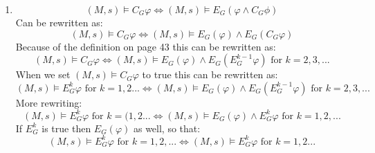\documentclass[12pt]{article} %
\begin{document}
\begin{enumerate}
    \item 
        \begin{equation}
        (M,s) \models C_G\varphi \Leftrightarrow (M,s) \models E_G(\varphi \wedge
        C_G\phi) 
        \end{equation}
        Can be rewritten as:
        \begin{equation}
            (M,s) \models C_G\varphi \Leftrightarrow (M,s) \models E_G(\varphi) \wedge
            E_G (C_G\varphi) 
        \end{equation}
        Because of the definition on page 43 this can be rewritten as:
        \begin{equation}
            (M,s) \models C_G\varphi \Leftrightarrow (M,s) \models E_G(\varphi) \wedge
            E_G(E_G^{k-1}\varphi) \mbox{ for } k = 2,3, ... 
        \end{equation}
        When we set $(M,s)\models C_G\varphi$ to true this can be rewritten as:
        \begin{equation}
            (M,s) \models E_G^k\varphi  \mbox{ for } k = 1,2 ... \Leftrightarrow (M,s) \models E_G(\varphi) \wedge
            E_G(E_G^{k-1}\varphi) \mbox{ for } k = 2, 3, ... 
        \end{equation}
        More rewriting:
        \begin{equation}
            (M,s) \models E_G^k\varphi  \mbox{ for } k = (1,2 ... \Leftrightarrow (M,s) \models E_G(\varphi) \wedge
            E_G^{k}\varphi 	\mbox{ for } k = 1, 2, ...  
        \end{equation}
        If $E_G^k$ is true then $E_G(\varphi)$ as well, so that:
        \begin{equation}
            (M,s) \models E_G^k\varphi  \mbox{ for } k = 1, 2, ... \Leftrightarrow (M,s)
            \models
            E_G^{k}\varphi \mbox{ for } k = 1, 2...  
        \end{equation}


\end{enumerate}
\end{document}
